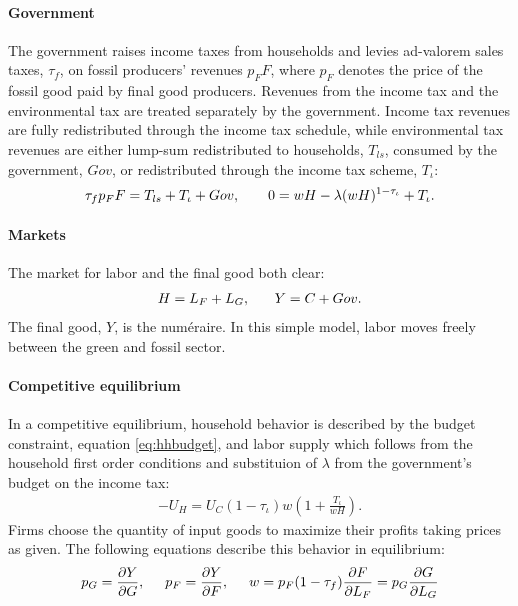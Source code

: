 \paragraph{Government}
The government raises income taxes from households and levies ad-valorem sales taxes, $\tau_f$, on fossil producers' revenues $p_FF$, where $p_F$ denotes the price of the fossil good paid by final good producers. Revenues from the income tax and the environmental tax are treated separately by the government. Income tax revenues are fully redistributed through the income tax schedule, while environmental tax revenues are either lump-sum redistributed to households, $T_{ls}$, consumed by the government, $Gov$, or redistributed through the income tax scheme, $T_\iota$:
\begin{align}
\tau_{f}p_FF=T_{ls}+T_\iota+Gov, \hspace{7mm}
0={w H}-\lambda(w H)^{1-\tau_{\iota}}+T_\iota. \label{eq:gov_but}
\end{align}

\paragraph{Markets}
The market for labor and the final good both clear: 
\begin{align}
H=L_F+L_G,\ \hspace{5mm} Y=C+Gov. \label{eq:market_clear}
\end{align}
 The final good, $Y$, is the numéraire. In this simple model, labor moves freely between the green and fossil sector. 
\paragraph{Competitive equilibrium}
In a competitive equilibrium, household behavior is described by the budget constraint, equation \ref{eq:hhbudget}, and labor supply which follows from the household first order conditions and substituion of $\lambda$ from the government's budget on the income tax:
\begin{align}
-U_H=U_C(1-\tau_{\iota})w\left(1+\frac{T_\iota}{wH}\right). \label{eq:hsup}
\end{align}
Firms choose the quantity of input goods to maximize their profits taking prices as given. The following equations describe this behavior in equilibrium:
\begin{align}
p_G=\frac{\partial Y}{\partial G}, \hspace{5mm}
p_F = \frac{\partial Y}{\partial F}, \hspace{5mm}
w= p_F(1-\tau_f)\frac{\partial F}{\partial L_F}=p_G\frac{\partial G}{\partial L_G}\label{eq:profmax}
\end{align}

